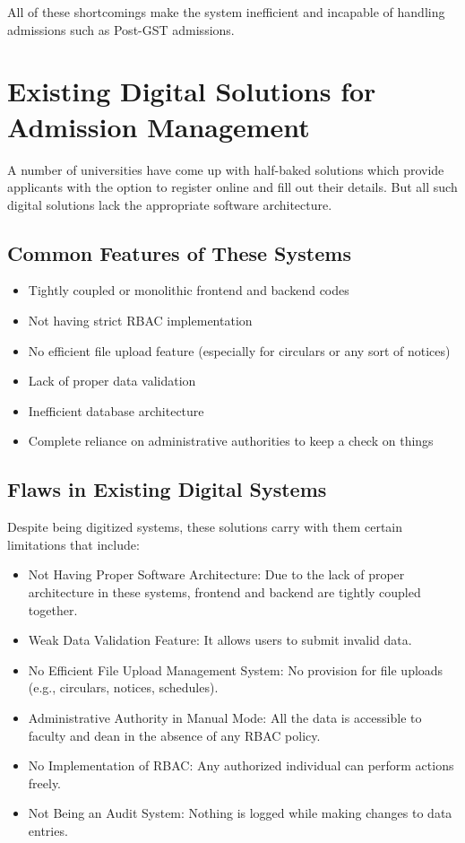 All of these shortcomings make the system inefficient and incapable of handling admissions such as Post-GST admissions.

\section{Existing Digital Solutions for Admission Management}

A number of universities have come up with half-baked solutions which provide applicants with the option to register online and fill out their details. But all such digital solutions lack the appropriate software architecture.



\subsection*{Common Features of These Systems}

\begin{itemize}
    \item Tightly coupled or monolithic frontend and backend codes
    \item Not having strict RBAC implementation
    \item No efficient file upload feature (especially for circulars or any sort of notices)
    \item Lack of proper data validation
    \item Inefficient database architecture
    \item Complete reliance on administrative authorities to keep a check on things
\end{itemize}

\subsection{Flaws in Existing Digital Systems}

Despite being digitized systems, these solutions carry with them certain limitations that include:

\begin{itemize}
    \item Not Having Proper Software Architecture: Due to the lack of proper architecture in these systems, frontend and backend are tightly coupled together.
    \item Weak Data Validation Feature: It allows users to submit invalid data.
    \item No Efficient File Upload Management System: No provision for file uploads (e.g., circulars, notices, schedules).
    \item Administrative Authority in Manual Mode: All the data is accessible to faculty and dean in the absence of any RBAC policy.
    \item No Implementation of RBAC: Any authorized individual can perform actions freely.
    \item Not Being an Audit System: Nothing is logged while making changes to data entries.
\end{itemize}

